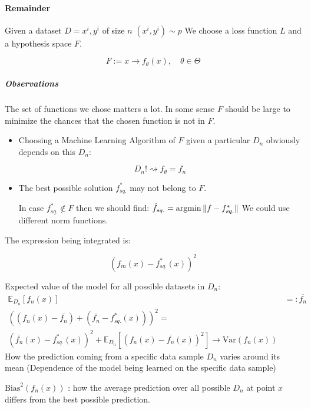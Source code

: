 \paragraph{Remainder}

Given a dataset \(D = {x^i, y^i}\) of size \(n\) \((x^i, y^i)\sim p\) We
choose a loss function \(L\) and a hypothesis space \(F\).

\[F := { x \rightarrow f_\theta(x),\quad \theta \in \Theta }
\]

\subparagraph{Observations}

The set of functions we chose matters a lot. In some sense \(F\) should
be large to minimize the chances that the chosen function is not in
\(F\).

\begin{itemize}
	\item
	      Choosing a Machine Learning Algorithm of \(F\) given a particular
	      \(D_n\) obviously depends on this \(D_n\):

	      \[D_n! \rightsquigarrow f_\theta = f_n\]
	\item The best possible solution \(f^*_{sq.}\) may not belong to \(F\).

	      In case \(f^*_{sq.} \notin F\) then we should find:
	      \(\hat{f}_{sq.} = \operatorname{argmin} {\lVert f - f^*_{sq.} \rVert}\)
	      We could use different norm functions.
\end{itemize}

The expression being integrated is:

\[\left( f_m(x) - f^*_{sq.}(x) \right)^2
\]

Expected value of the model for all possible datasets in \(D_n\):
\begin{align*}
	\mathds{E}_{D_n} \left[ f_n(x) \right] & =: \overline{f_n}                                               \\
	\left( \left( f_n(x) - \overline{f_n} \right) + \left( \overline{f_n} - f_{sq.}^*(x) \right) \right)^2 = \\
	\left( \overline{f_n}(x) - f_{sq.}^*(x) \right)^2 +
	\mathds{E}_{D_n} \left[ \left( f_n(x) - \overline{f_n}(x) \right)^2 \right]
	\rightarrow \text{Var}(f_n(x))
\end{align*}
How the prediction coming from a specific data sample $D_n$ varies around its mean
(Dependence of the model being learned on the specific data sample)

\(\text{Bias}^2(f_n(x))\) : how the average prediction over all possible
\(D_n\) at point \(x\) differs from the best possible prediction.

